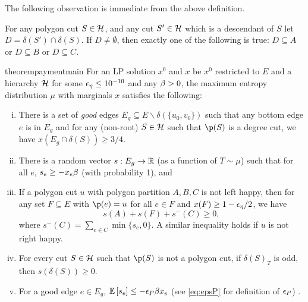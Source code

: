The following observation is immediate from the above definition.
\begin{observation}\label{obs:childofSD}
	For any polygon cut $S\in\mathcal{H}$, and any cut $S'\in\mathcal{H}$ which is a descendant of $S$ let $D=\delta(S')\cap \delta(S)$. If $D\neq \emptyset$, then exactly one of the following is true: $D\subseteq A$ or $D\subseteq B$ or $D\subseteq C$.
\end{observation}

\begin{restatable}{theorem}{paymentmain}
\label{thm:payment-main}
For an LP solution $x^0$ and $x$ be $x^0$ restricted to $E$ and a hierarchy $\mathcal{H}$ for some ${\epsilon}_\eta\leq 10^{-10}$ and any $\beta > 0$,
the maximum entropy distribution $\mu$ with marginals $x$ satisfies the following:
\begin{enumerate}[i)]
\item There is a set of {\em good} edges $E_g\subseteq E\smallsetminus \delta(\{u_0,v_0\})$ such that any bottom edge $e$ is in $E_g$ and  for any (non-root) $S\in \mathcal{H}$ such that $\p(S)$ is  a degree cut, we have $x(E_g\cap \delta(S))\geq 3/4$. 
\item There is a random vector $s:E_g \to \mathbb{R}$  (as a function of $T\sim\mu$) such that for all $e$, $s_e\geq -x_e \beta$ (with probability 1), and \label{payment:non-near-min-cuts}
\item If a polygon cut $u$ with polygon partition $A,B,C$ is not left happy, then for any set $F\subseteq E$ with $\p(e)=u$ for all $e\in F$ and $x(F)\geq 1-{\epsilon}_\eta/2$, we have
$$ s(A)+s(F)+s^-(C)\geq 0,$$
where $s^-(C)=\sum_{e\in C} \min\{s_e,0\}$.
A similar inequality holds if $u$ is not right happy.
\item %
For every cut $S\in \mathcal{H}$ such that $\p(S)$ is not a polygon cut, if $\delta(S)_T$ is odd, then $s(\delta(S))\geq 0$. \label{payment:satisfy-non-poly-cuts}
\item %
For a good edge $e\in E_g$, ${\mathbb{E}}\left[s_e\right] \le  - {\epsilon}_P \beta x_e$ (see \cref{eq:epsP} for definition of ${\epsilon}_P$) . %
\end{enumerate}
\end{restatable}

